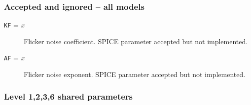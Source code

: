 \subsubsection{Accepted and ignored -- all models}
\begin{description}

\item[{\tt KF} = {\it x}] Flicker noise coefficient.  SPICE parameter
accepted but not implemented.

\item[{\tt AF} = {\it x}] Flicker noise exponent.  SPICE parameter accepted
but not implemented.

\end{description}
\subsubsection{Level 1,2,3,6 shared parameters}
